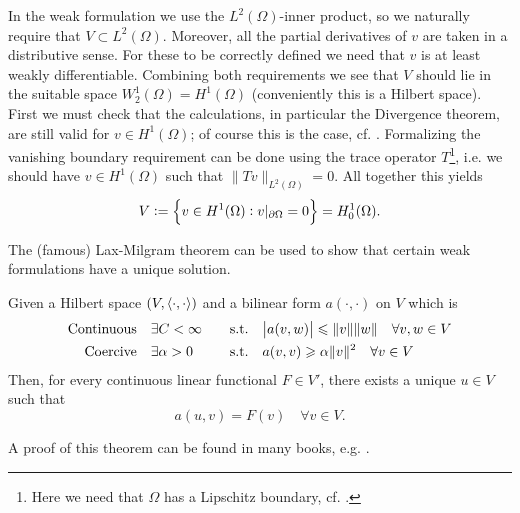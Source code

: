 \documentclass[thesis.tex]{subfiles}
\begin{document}
In the weak formulation we use the $L^2(\Omega)$-inner product, so we naturally require that $V \subset L^2(\Omega)$. Moreover, all the partial derivatives of $v$ are taken in a distributive sense. For these to be correctly defined we need that $v$ is at least weakly differentiable. Combining both requirements we see that $V$ should lie in the suitable space $W_2^1(\Omega) = H^1(\Omega)$ (conveniently this is a Hilbert space). First we must check that the calculations, in particular the Divergence theorem, are still valid for $v \in H^1(\Omega)$; of course this is the case, cf. \cite[Ch. 5]{brenner}. Formalizing the vanishing boundary requirement can be done using the trace operator $T$\footnote{Here we need that $\Omega$ has a Lipschitz boundary, cf. \cite[Ch. 1.6]{brenner}.}, i.e. we should have $v \in H^1(\Omega)$ such that $\|Tv\|_{L^2(\Omega)} = 0$. All together this yields
\[
  V := \set{v \in H^1(\Omega): v|_{\partial \Omega} = 0} = H_0^1(\Omega).
\]

The (famous) Lax-Milgram theorem can be used to show that certain weak formulations have a unique solution.
\begin{thm}
  \label{thm:lax}
  Given a Hilbert space $(V, \left \langle \cdot, \cdot \right \rangle)$ and a bilinear form $a(\cdot,\cdot)$ on $V$ which is
  \begin{alignat*}{3}
    \text{Continuous} \quad & \exists C < \infty \quad & \text{s.t.} \quad & \abs{a(v,w)} \leqslant \|v\|\|w\| \quad \forall v,w \in V \\
    \text{Coercive}   \quad & \exists \alpha > 0 \quad &\text{s.t.} \quad & a(v,v) \geqslant \alpha \|v\|^2 \quad \forall v \in V
  \end{alignat*}
  Then, for every continuous linear functional $F \in V'$, there exists a unique $u \in V$ such that
  \[
    a(u,v) = F(v) \quad \forall v\in V.
  \]
\end{thm}
A proof of this theorem can be found in many books, e.g. \cite[Ch. 2]{brenner}. 
\end{document}
